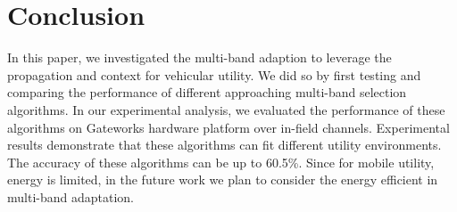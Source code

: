 \section{Conclusion}
\label{sec:conclusion}
In this paper, we investigated the multi-band adaption to leverage the propagation and context for vehicular utility. 
We did so by first testing and comparing the performance of different approaching multi-band selection algorithms. 
In our experimental analysis, we evaluated the performance of these algorithms on Gateworks hardware platform over in-field channels. 
Experimental results demonstrate that these algorithms can fit different utility environments. The accuracy of these algorithms can be up to 60.5\%.
Since for mobile utility, energy is limited, in the future work we plan to consider the energy efficient in multi-band adaptation.

